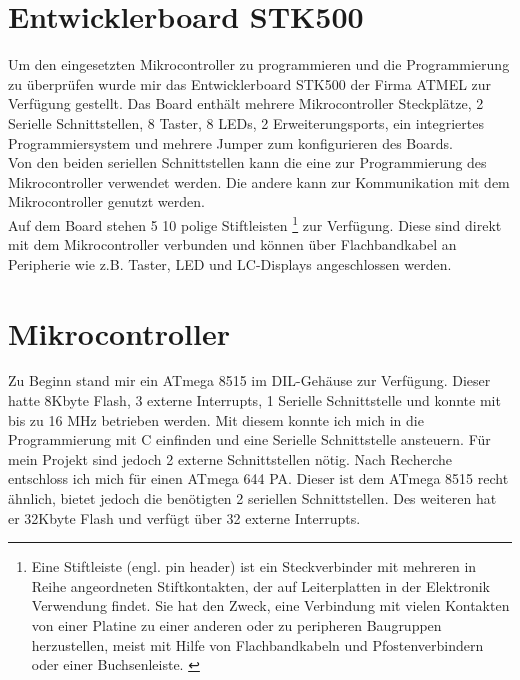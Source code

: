 \section{Entwicklerboard STK500}
Um den eingesetzten Mikrocontroller zu programmieren und die Programmierung zu überprüfen wurde mir das Entwicklerboard STK500 der Firma ATMEL zur Verfügung gestellt. Das Board enthält mehrere Mikrocontroller Steckplätze, 2 Serielle Schnittstellen, 8 Taster, 8 LEDs, 2 Erweiterungsports, ein integriertes Programmiersystem  und mehrere Jumper zum konfigurieren des Boards.\\
Von den beiden seriellen Schnittstellen kann die eine zur Programmierung des Mikrocontroller verwendet werden. Die andere kann zur Kommunikation mit dem Mikrocontroller genutzt werden.\\
Auf dem Board stehen 5 10 polige Stiftleisten 
\footnote{Eine Stiftleiste (engl. pin header) ist ein Steckverbinder mit mehreren in Reihe angeordneten Stiftkontakten, der auf Leiterplatten in der Elektronik Verwendung findet. Sie hat den Zweck, eine Verbindung mit vielen Kontakten von einer Platine zu einer anderen oder zu peripheren Baugruppen herzustellen, meist mit Hilfe von Flachbandkabeln und Pfostenverbindern oder einer Buchsenleiste. \cite{wiki_pinh} }
zur Verfügung. Diese sind direkt mit dem Mikrocontroller verbunden und können über Flachbandkabel an Peripherie wie z.B. Taster, LED und LC-Displays angeschlossen werden.
\section{Mikrocontroller}
Zu Beginn stand mir ein ATmega 8515\cite{atmel_8515} im DIL-Gehäuse zur Verfügung. Dieser hatte 8Kbyte Flash, 3 externe Interrupts, 1 Serielle Schnittstelle und konnte mit bis zu 16 MHz betrieben werden. Mit diesem konnte ich mich in die Programmierung mit C einfinden und eine Serielle Schnittstelle ansteuern. Für mein Projekt sind jedoch 2 externe Schnittstellen nötig. Nach Recherche entschloss ich mich für einen ATmega 644 PA.  Dieser ist dem ATmega 8515 recht ähnlich, bietet jedoch die benötigten 2 seriellen Schnittstellen. Des weiteren hat er 32Kbyte Flash und verfügt über 32 externe Interrupts. 